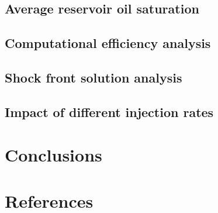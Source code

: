 \documentclass[11pt]{article}
\begin{document}
\subsection{Average reservoir oil saturation}

\subsection{Computational efficiency analysis}

\subsection{Shock front solution analysis}

\subsection{Impact of different injection rates}
\smallbreak
\section{Conclusions}

\smallbreak
\section{References}

\newpage
\end{document}
